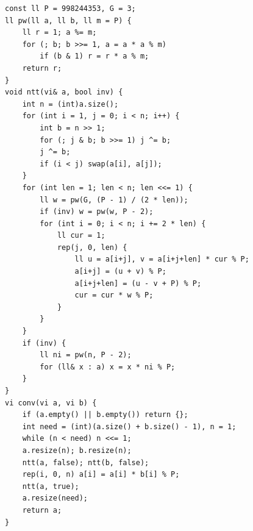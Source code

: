 \begin{lstlisting}
const ll P = 998244353, G = 3;
ll pw(ll a, ll b, ll m = P) {
    ll r = 1; a %= m;
    for (; b; b >>= 1, a = a * a % m)
        if (b & 1) r = r * a % m;
    return r;
}
void ntt(vi& a, bool inv) {
    int n = (int)a.size();
    for (int i = 1, j = 0; i < n; i++) {
        int b = n >> 1;
        for (; j & b; b >>= 1) j ^= b;
        j ^= b;
        if (i < j) swap(a[i], a[j]);
    }
    for (int len = 1; len < n; len <<= 1) {
        ll w = pw(G, (P - 1) / (2 * len));
        if (inv) w = pw(w, P - 2);
        for (int i = 0; i < n; i += 2 * len) {
            ll cur = 1;
            rep(j, 0, len) {
                ll u = a[i+j], v = a[i+j+len] * cur % P;
                a[i+j] = (u + v) % P;
                a[i+j+len] = (u - v + P) % P;
                cur = cur * w % P;
            }
        }
    }
    if (inv) {
        ll ni = pw(n, P - 2);
        for (ll& x : a) x = x * ni % P;
    }
}
vi conv(vi a, vi b) {
    if (a.empty() || b.empty()) return {};
    int need = (int)(a.size() + b.size() - 1), n = 1;
    while (n < need) n <<= 1;
    a.resize(n); b.resize(n);
    ntt(a, false); ntt(b, false);
    rep(i, 0, n) a[i] = a[i] * b[i] % P;
    ntt(a, true);
    a.resize(need);
    return a;
}
\end{lstlisting}
